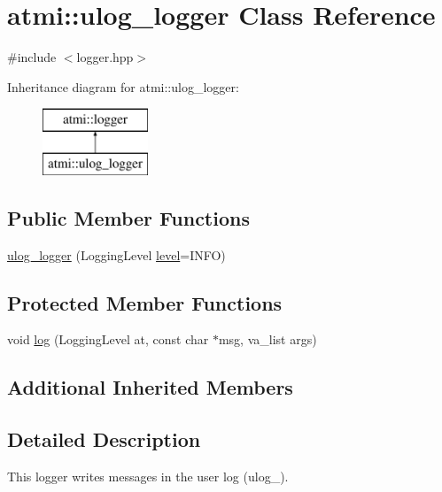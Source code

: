 \hypertarget{classatmi_1_1ulog__logger}{}\section{atmi\+:\+:ulog\+\_\+logger Class Reference}
\label{classatmi_1_1ulog__logger}


{\ttfamily \#include $<$logger.\+hpp$>$}

Inheritance diagram for atmi\+:\+:ulog\+\_\+logger\+:\begin{figure}[H]
\begin{center}
\leavevmode
\includegraphics[height=2.000000cm]{classatmi_1_1ulog__logger}
\end{center}
\end{figure}
\subsection*{Public Member Functions}
\begin{DoxyCompactItemize}
\item 
\hyperlink{classatmi_1_1ulog__logger_ab8c093b492bff137bf6cec6a9e9daa71}{ulog\+\_\+logger} (Logging\+Level \hyperlink{classatmi_1_1logger_a70bf3a05b911b63d4548507fdea5dfbd}{level}=I\+N\+F\+O)
\end{DoxyCompactItemize}
\subsection*{Protected Member Functions}
\begin{DoxyCompactItemize}
\item 
void \hyperlink{classatmi_1_1ulog__logger_a30dce356534da360945564d14fbe0da8}{log} (Logging\+Level at, const char $\ast$msg, va\+\_\+list args)
\end{DoxyCompactItemize}
\subsection*{Additional Inherited Members}


\subsection{Detailed Description}
This logger writes messages in the user log (ulog\+\_\+).

